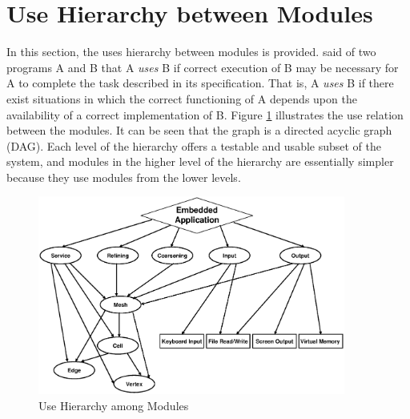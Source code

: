 \documentclass[12pt,titlepage]{article}
\begin{document}
\section{Use Hierarchy between Modules \label{AmgSecUse}}
In this section, the uses hierarchy between modules is provided. \citet{Parnas1978} said of two programs A and B that A {\em uses} B if correct execution of B may be necessary for A to complete the task described in its specification. That is, A {\em uses} B if there exist situations in which the correct functioning of A depends upon the availability of a correct implementation of B. Figure \ref{fig:uh} illustrates the use relation between the modules. It can be seen that the graph is a directed acyclic graph (DAG). Each level of the hierarchy offers a testable and usable subset of the system, and modules in the higher level of the hierarchy are essentially simpler because they use modules from the lower levels. 
\begin{figure}[htbp]
\centering
\includegraphics[width=0.90\textwidth]{uh.eps}
\caption{Use Hierarchy among Modules}
\label{fig:uh}
\end{figure}

\newpage



\end{document}

